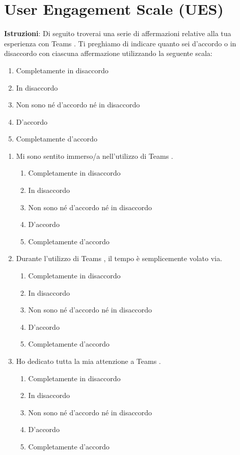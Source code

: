 \documentclass{article}
\newcommand{\app}{Teams \hspace{0.1em}}
\begin{document}
\section*{User Engagement Scale (UES)}

\noindent \textbf{Istruzioni}: Di seguito troverai una serie di affermazioni relative alla tua esperienza con \app. Ti preghiamo di indicare quanto sei d'accordo o in disaccordo con ciascuna affermazione utilizzando la seguente scala:

\begin{enumerate}
    \item Completamente in disaccordo
    \item In disaccordo
    \item Non sono né d’accordo né in disaccordo
    \item D’accordo
    \item Completamente d’accordo
\end{enumerate}


\begin{enumerate}[label=\textbf{Domanda \arabic*.}]
    \item Mi sono sentito immerso/a nell'utilizzo di \app.
    \begin{enumerate}
    \item Completamente in disaccordo
    \item In disaccordo
    \item Non sono né d’accordo né in disaccordo
    \item D’accordo
    \item Completamente d’accordo
\end{enumerate}
    \item Durante l'utilizzo di \app, il tempo è semplicemente volato via.
    \begin{enumerate}
    \item Completamente in disaccordo
    \item In disaccordo
    \item Non sono né d’accordo né in disaccordo
    \item D’accordo
    \item Completamente d’accordo
\end{enumerate}
    \item Ho dedicato tutta la mia attenzione a \app.
    \begin{enumerate}
    \item Completamente in disaccordo
    \item In disaccordo
    \item Non sono né d’accordo né in disaccordo
    \item D’accordo
    \item Completamente d’accordo
\end{enumerate}
\end{enumerate}
\end{document}
